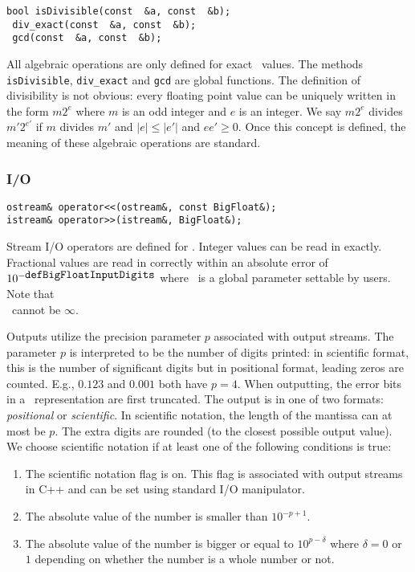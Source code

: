 \begin{progb}{
\>\tt	bool isDivisible(const \BF\ \&a, const \BF\ \&b); \\
\>\tt	\BF\ div\_exact(const \BF\ \&a, const \BF\ \&b); \\
\>\tt	\BF\ gcd(const \BF\ \&a, const \BF\ \&b); 
}\end{progb}

All algebraic operations are only defined for exact \BF\ values.
The methods \texttt{isDivisible},
\texttt{div\_exact} and
\texttt{gcd} are global functions. 
The definition of divisibility is not obvious: every floating point value
can be uniquely written in the form $m 2^e$ where $m$ is an odd integer
and $e$ is an integer.  We say $m2^e$ divides $m'2^{e'}$ if
$m$ divides $m'$ and $|e|\le |e'|$ and $ee'\ge 0$.
Once this concept is defined, the meaning of these algebraic
operations are standard.

\subsubsection{I/O}
\label{sec-BF-out}

\begin{progb} {
\> \tt 	 ostream\& operator<<(ostream\&, const BigFloat\&);\\
\> \tt 	 istream\& operator>>(istream\&, BigFloat\&);
}\end{progb}

Stream I/O operators are defined for \BF. Integer values can be read in exactly.
Fractional values are read in correctly within an absolute error
of $10^{-\mbox{\tt defBigFloatInputDigits}}$
where \ is a global parameter settable by users.
Note that\\
\ cannot be $\infty$.

Outputs utilize the precision parameter $p$ associated with output
streams. The parameter $p$ is interpreted to be the number of digits printed:
in scientific format, this is the number of significant digits
but in positional format, leading zeros are counted.  E.g.,
$0.123$ and $0.001$ both have $p=4$.
When outputting, the error bits in a \BF\ representation
are first truncated. The output is in one of two formats: 
{\em positional} or {\em scientific}.
In scientific
notation, the length of the mantissa can at most be $p$. The extra
digits are rounded (to the closest possible output value). 
We choose scientific
notation if at least one of the following conditions is true:
\begin{enumerate}
\item The scientific notation flag is on. This flag is associated with 
output streams in C++ and can be set using standard I/O manipulator.
\item The absolute value of the number is smaller than $10^{-p+1}$.
\item The absolute value of the number is bigger or equal to
$10^{p-\delta}$ where $\delta=0$ or $1$ depending on whether
the number is a whole number or not.
\end{enumerate}

